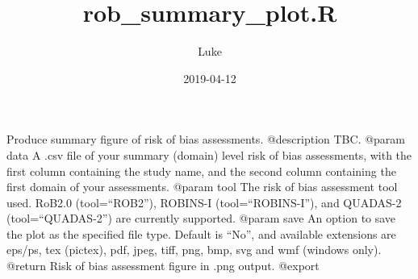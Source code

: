 \documentclass[]{article}
\title{rob\_summary\_plot.R}
\author{Luke}
\date{2019-04-12}
\begin{document}
\maketitle

Produce summary figure of risk of bias assessments. @description TBC.
@param data A .csv file of your summary (domain) level risk of bias
assessments, with the first column containing the study name, and the
second column containing the first domain of your assessments. @param
tool The risk of bias assessment tool used. RoB2.0 (tool=``ROB2''),
ROBINS-I (tool=``ROBINS-I''), and QUADAS-2 (tool=``QUADAS-2'') are
currently supported. @param save An option to save the plot as the
specified file type. Default is ``No'', and available extensions are
eps/ps, tex (pictex), pdf, jpeg, tiff, png, bmp, svg and wmf (windows
only). @return Risk of bias assessment figure in .png output. @export
\end{document}
